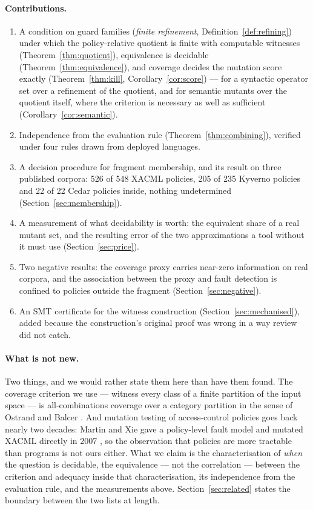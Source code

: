 \documentclass[11pt,a4paper]{article}
\theoremstyle{plain}
\theoremstyle{definition}
\theoremstyle{remark}
\begin{document}
\paragraph{Contributions.}
\begin{enumerate}
  \item A condition on guard families (\emph{finite refinement}, Definition~\ref{def:refining})
    under which the policy-relative quotient is finite with computable witnesses
    (Theorem~\ref{thm:quotient}), equivalence is decidable (Theorem~\ref{thm:equivalence}),
    and coverage decides the mutation score exactly (Theorem~\ref{thm:kill},
    Corollary~\ref{cor:score}) --- for a syntactic operator set over a refinement of the
    quotient, and for semantic mutants over the quotient itself, where the criterion is
    necessary as well as sufficient (Corollary~\ref{cor:semantic}).
  \item Independence from the evaluation rule (Theorem~\ref{thm:combining}), verified under
    four rules drawn from deployed languages.
  \item A decision procedure for fragment membership, and its result on three published
    corpora: 526 of 548 XACML policies, 205 of 235 Kyverno policies and 22 of 22 Cedar
    policies inside, nothing undetermined (Section~\ref{sec:membership}).
  \item A measurement of what decidability is worth: the equivalent share of a real mutant
    set, and the resulting error of the two approximations a tool without it must use
    (Section~\ref{sec:price}).
  \item Two negative results: the coverage proxy carries near-zero information on real
    corpora, and the association between the proxy and fault detection is confined to
    policies outside the fragment (Section~\ref{sec:negative}).
  \item An SMT certificate for the witness construction (Section~\ref{sec:mechanised}),
    added because the construction's original proof was wrong in a way review did not catch.
\end{enumerate}

\paragraph{What is not new.} Two things, and we would rather state them here than have them
found. The coverage criterion we use --- witness every class of a finite partition of the
input space --- is all-combinations coverage over a category partition in the sense of
Ostrand and Balcer \cite{ostrand1988category}. And mutation testing of access-control
policies goes back nearly two decades: Martin and Xie gave a policy-level fault model and
mutated XACML directly in 2007 \cite{martin2007fault}, so the observation that policies are more
tractable than programs is not ours either. What we claim is the characterisation of
\emph{when} the question is decidable, the equivalence --- not the correlation --- between
the criterion and adequacy inside that characterisation, its independence from the
evaluation rule, and the measurements above. Section~\ref{sec:related} states the boundary
between the two lists at length.
\end{document}
